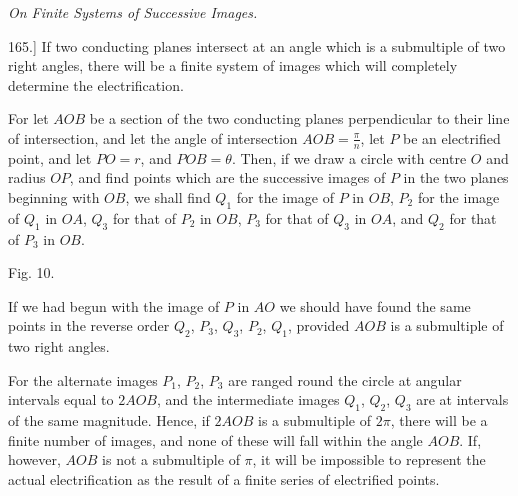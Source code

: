 \documentclass[11pt,a4paper]{article}
\begin{document}
\begin{center}
\textit{On Finite Systems of Successive Images.}
\end{center}

165.] If two conducting planes intersect at an angle which is a
submultiple of two right angles, there will be a finite system of
images which will completely determine the electrification.

For let $AOB$ be a section of the two conducting planes perpendicular
to their line of intersection, and let the angle of intersection
$AOB=\frac{\pi}{n}$, let $P$ be an electrified point, and let $PO=r$,
and $POB=\theta$. Then, if we draw a circle with centre $O$ and radius
$OP$, and find points which are the successive images of $P$ in the two
planes beginning with $OB$, we shall find $Q_1$ for the image of $P$ in
$OB$, $P_2$ for the image of $Q_1$ in $OA$, $Q_3$ for that of $P_2$ in
$OB$, $P_3$ for that of $Q_3$ in $OA$, and $Q_2$ for that of $P_3$ in
$OB$.

\begin{center}

Fig. 10.
\end{center}

If we had begun with the image of $P$ in $AO$ we should have found the
same points in the reverse order $Q_2$, $P_3$, $Q_3$, $P_2$, $Q_1$,
provided $AOB$ is a submultiple of two right angles.

For the alternate images $P_1$, $P_2$, $P_3$ are ranged round the
circle at angular intervals equal to $2AOB$, and the intermediate
images $Q_1$, $Q_2$, $Q_3$ are at intervals of the same magnitude.
Hence, if $2AOB$ is a submultiple of $2\pi$, there will be a finite
number of images, and none of these will fall within the angle $AOB$.
If, however, $AOB$ is not a submultiple of $\pi$, it will be impossible
to represent the actual electrification as the result of a finite
series of electrified points.
\end{document}

